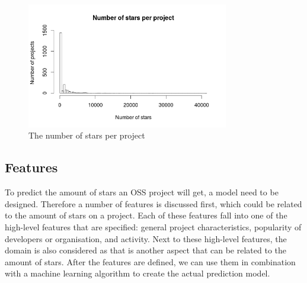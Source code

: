         
    \begin{figure}[t!]
        \includegraphics[width=250pt]{figures/number-of-stars-per-project}
	    \caption{The number of stars per project}
	    \label{fig:nr-stars-plot}
	\end{figure}
    
    \subsection{Features}
    To predict the amount of stars an OSS project will get, a model need to be designed.
    Therefore a number of features is discussed first, which could be related to the amount of stars on a project.
    Each of these features fall into one of the high-level features that are specified: general project characteristics, popularity of developers or organisation, and activity.
    Next to these high-level features, the domain is also considered as that is another aspect that can be related to the amount of stars.
    After the features are defined, we can use them in combination with a machine learning algorithm to create the actual prediction model.\\

